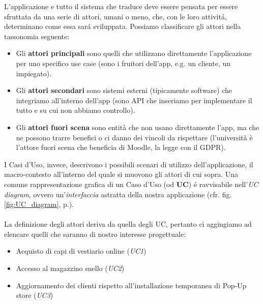 \documentclass[12pt]{article}
\begin{document}
L'applicazione e tutto il sistema che traduce deve essere pensata per essere sfruttata da una serie di attori, umani o meno, che, con le loro attivit\'a, determinano come essa sar\'a sviluppata. Possiamo classificare gli attori nella tassonomia seguente:
\begin{itemize}
    \item Gli \textbf{attori principali} sono quelli che utilizzano direttamente l’applicazione per uno specifico use case (sono i fruitori dell’app, e.g. un cliente, un impiegato).
    \item Gli \textbf{attori secondari} sono sistemi esterni (tipicamente software) che integriamo all’interno dell’app (sono API che inseriamo per implementare il tutto e su cui non abbiamo controllo).
    \item Gli \textbf{attori fuori scena} sono entità che non usano direttamente l’app, ma che ne possono trarre benefici o ci danno dei vincoli da rispettare (l’università è l’attore fuori scena che beneficia di Moodle, la legge con il GDPR).
\end{itemize}

I Casi d'Uso, invece, descrivono i possibili scenari di utilizzo dell'applicazione, il macro-contesto all'interno del quale si muovono gli attori di cui sopra. Una comune rappresentazione grafica di un Caso d'Uso (od \textbf{UC}) \'e ravvisabile nell'{\em UC diagram}, ovvero un'\textit{interfaccia} astratta della nostra applicazione (cfr. fig. \ref{fig:UC_diagram}, p.\pageref{fig:UC_diagram}).
\\
\\
La definizione degli attori deriva da quella degli UC, pertanto ci aggingiamo ad elencare quelli che saranno di nostro interesse progettuale:
\begin{itemize}
    \item Acquisto di capi di vestiario online (\textit{UC1})
    \item Accesso al magazzino snello (\textit{UC2})
    \item Aggiornamento dei clienti rispetto all'installazione temporanea di Pop-Up store (\textit{UC3})
\end{itemize}
\end{document}
